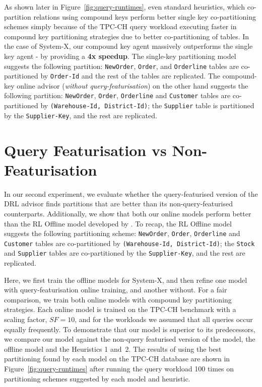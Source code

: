 As shown later in Figure~\ref{fig:query-runtimes}, even standard heuristics, which co-partition relations using compound keys perform better single key co-partitioning schemes simply because of the TPC-CH query workload executing faster in compound key partitioning strategies due to better co-partitioning of tables. In the case of System-X, our compound key agent massively outperforms the single key agent - by providing a \textbf{4x speedup}. The single-key partitioning model suggests the following partition: \texttt{NewOrder}, \texttt{Order}, and \texttt{Orderline} tables are co-partitioned by \texttt{Order-Id} and the rest of the tables are replicated. The compound-key online advisor (\textit{without query-featurisation}) on the other hand suggests the following partition: \texttt{NewOrder}, \texttt{Order}, \texttt{Orderline} and \texttt{Customer} tables are co-partitioned by \texttt{(Warehouse-Id, District-Id)}; the \texttt{Supplier} table is partitioned by the \texttt{Supplier-Key}, and the rest are replicated. 


\section{Query Featurisation vs Non-Featurisation}
\label{sec:qfvsnonqf}
In our second experiment, we evaluate whether the query-featurised version of the DRL advisor finds partitions that are better than its non-query-featurised counterparts. Additionally, we show that both our online models perform better than the RL Offline model developed by \citeauthor{Hilprecht:2019:TLP:3329859.3329876}. To recap, the RL Offline model suggests the following partitioning scheme: \texttt{NewOrder}, \texttt{Order}, \texttt{Orderline} and \texttt{Customer} tables are co-partitioned by \texttt{(Warehouse-Id, District-Id)}; the \texttt{Stock} and \texttt{Supplier} tables are co-partitioned by the \texttt{Supplier-Key}, and the rest are replicated. 

Here, we first train the offline models for System-X, and then refine one model with query-featurisation online training, and another without. For a fair comparison, we train both online models with compound key partitioning strategies. Each online model is trained on the TPC-CH benchmark with a scaling factor, $SF=10$, and for the workloads we assumed that all queries occur equally frequently. To demonstrate that our model is superior to its predecessors, we compare our model against the non-query featurised version of the model, the offline model and the Heuristics 1 and~2. The results of using the best partitioning found by each model on the TPC-CH database are shown in Figure~\ref{fig:query-runtimes} after running the query workload 100 times on partitioning schemes suggested by each model and heuristic. 

